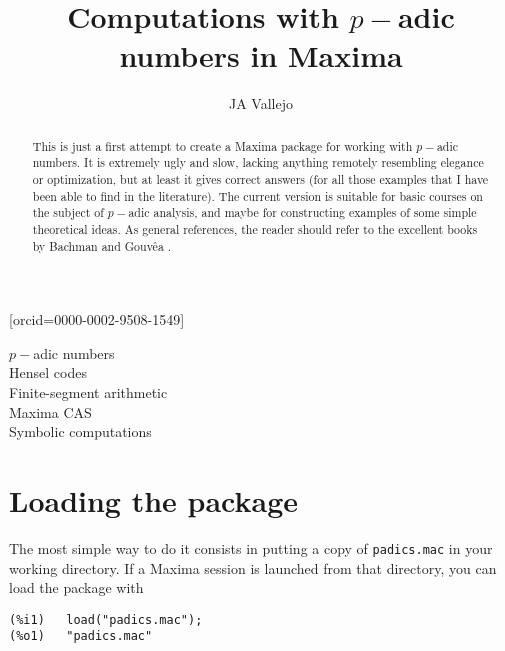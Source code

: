 \documentclass[fleqn]{cas-sc}
\begin{document}
\let\WriteBookmarks\relax
\def\floatpagepagefraction{1}
\def\textpagefraction{.001}

\title[mode=title]{Computations with $p-$adic numbers in Maxima}                      


\author[1]{JA Vallejo}[orcid=0000-0002-9508-1549]
\cormark[1]
\fnmark[1]
\address[1]{Facultad de Ciencias, Universidad Aut\'onoma de San Luis Potos\'i,\\
Av Chapultepec 1570 Col. Lomas del Pedregal\\
CP 78295 San Luis Potos\'i (SLP) M\'exico}





\begin{abstract}
This is just a first attempt to create a Maxima package for working with $p-$adic numbers. It is extremely ugly and slow, lacking anything remotely resembling elegance or optimization, but at least it gives correct answers (for all those examples that I have been able to find in the literature). The current version is suitable for basic courses on the subject of $p-$adic analysis, and maybe for constructing examples of some simple theoretical ideas. As general references, the reader should refer to the excellent books by Bachman \cite{1} and Gouv\^ea
\cite{12}.
\end{abstract}


\begin{keywords}
$p-$adic numbers\\
Hensel codes\\
Finite-segment arithmetic\\
Maxima CAS\\
Symbolic computations
\end{keywords}


\maketitle


\section{Loading the package}

The most simple way to do it consists in putting a copy of \texttt{padics.mac} in your working 
directory. If a Maxima session is launched from that directory, you can load the package with
\begin{verbatim}
(%i1)	load("padics.mac");
(%o1)	"padics.mac"
\end{verbatim}
\end{document}
